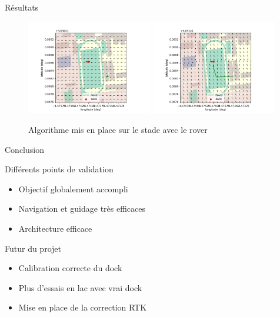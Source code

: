 \documentclass[pdftex,beamer,aspectratio=169]{beamer}
\theoremstyle{definition}
\theoremstyle{example}
\theoremstyle{plain}
\begin{document}
\begin{frame}[fragile]{Résultats}
  \begin{figure}
    \centering
    \includegraphics[width=0.49\textwidth]{visu_2.png}
    \includegraphics[width=0.49\textwidth]{visu_1.png}
    \caption*{Algorithme mis en place sur le stade avec le rover}
  \end{figure}
\end{frame}

\begin{frame}[fragile]{Conclusion}
  \begin{minipage}{0.49\textwidth}
    Différents points de validation
    \begin{itemize}
      \item Objectif globalement accompli
      \item Navigation et guidage très efficaces
      \item Architecture efficace
    \end{itemize}
  \end{minipage}
  \begin{minipage}{0.49\textwidth}
    Futur du projet
    \begin{itemize}
      \item Calibration correcte du dock
      \item Plus d'essais en lac avec vrai dock
      \item Mise en place de la correction RTK
    \end{itemize}
  \end{minipage}
\end{frame}
\end{document}

